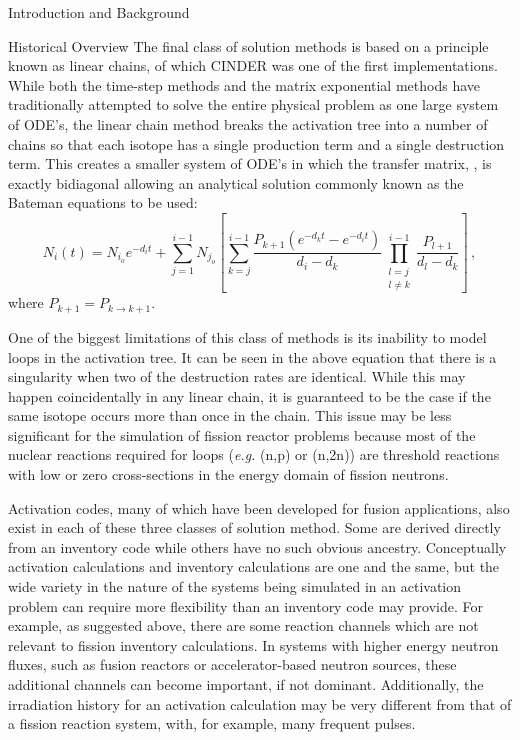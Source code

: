 \begin{chapter}{Introduction and Background}
\begin{section}{Historical Overview}
    The final class of solution methods is based on a principle known
    as linear chains, of which CINDER\cite{CINDER} was one of the
    first implementations.  While both the time-step methods and the
    matrix exponential methods have traditionally attempted to solve
    the entire physical problem as one large system of ODE's, the
    linear chain method breaks the activation tree into a number of
    chains so that each isotope has a single production term and a
    single destruction term.  This creates a smaller system of ODE's
    in which the transfer matrix, , is exactly bidiagonal
    allowing an analytical solution commonly known as the Bateman
    equations\cite{Bateman} to be used:
    \begin{equation}
      \label{intro.bateman}
      N_i(t) = N_{i_o}e^{-d_i t} + \sum_{j=1}^{i-1}N_{j_o}\left [
        \sum_{k=j}^{i-1}\frac{P_{k+1}(e^{-d_k t} - e^{-d_i t})}{d_i -
          d_k}\prod_{\substack{l=j\\l\neq k}}^{i-1}\frac{P_{l+1}}{d_l-d_k}\right] \, ,
    \end{equation}
    where $P_{k+1} = P_{k \rightarrow k+1}$.
  
    One of the biggest limitations of this class of methods is its
    inability to model loops in the activation tree.  It can be seen
    in the above equation that there is a singularity when two of the
    destruction rates are identical.  While this may happen
    coincidentally in any linear chain, it is guaranteed to be the
    case if the same isotope occurs more than once in the chain.  This
    issue may be less significant for the simulation of fission reactor
    problems because most of the nuclear reactions required for loops
    (\textsl{e.g.} (n,p) or (n,2n)) are threshold reactions with low
    or zero cross-sections in the energy domain of fission neutrons.
  
    Activation codes, many of which have been developed for fusion
    applications, also exist in each of these three classes of
    solution method.  Some are derived directly from an inventory code
    while others have no such obvious ancestry.  Conceptually
    activation calculations and inventory calculations are one and the
    same, but the wide variety in the nature of the systems being
    simulated in an activation problem can require more flexibility
    than an inventory code may provide.  For example, as suggested
    above, there are some reaction channels which are not relevant to
    fission inventory calculations.  In systems with higher energy
    neutron fluxes, such as fusion reactors or accelerator-based
    neutron sources, these additional channels can become important,
    if not dominant.  Additionally, the irradiation history for an
    activation calculation may be very different from that of a
    fission reaction system, with, for example, many frequent pulses.
  

\end{section}
\end{chapter}
